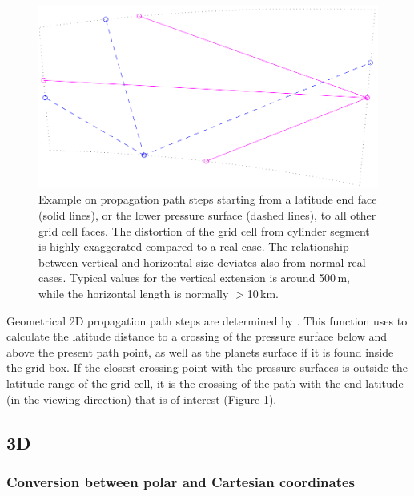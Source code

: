 \begin{figure}
 \begin{center}
  \includegraphics*[width=0.80\hsize]{ppath_ex3}
  \caption{Example on propagation path steps starting from a latitude end face 
    (solid lines), or the lower pressure surface (dashed lines), to
    all other grid cell faces. The distortion of the grid cell from
    cylinder segment is highly exaggerated compared to a real case.
    The relationship between vertical and horizontal size deviates
    also from normal real cases.  Typical values for the vertical
    extension is around 500\,m, while the horizontal length is
    normally $>$10\,km.}
  \label{fig:ppath:ex3}  
 \end{center}
\end{figure}

Geometrical 2D propagation path steps are determined by
. This function uses
 to calculate the latitude distance to a
crossing of the pressure surface below and above the present path point, as
well as the planets surface if it is found inside the grid box. If the closest
crossing point with the pressure surfaces is outside the latitude range of the
grid cell, it is the crossing of the path with the end latitude (in the viewing
direction) that is of interest (Figure \ref{fig:ppath:ex3}).



\subsection{3D}
\label{sec:ppath:3Dgeom}

\subsubsection{Conversion between polar and Cartesian coordinates}
\label{sec:ppath:cart2sph}

